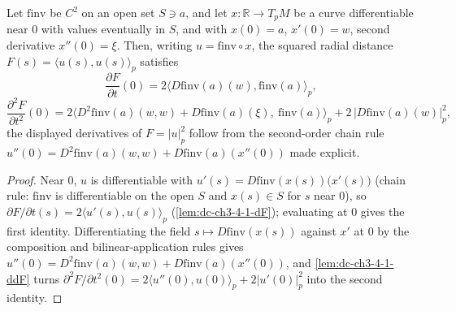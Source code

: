 \begin{lemma}
  \label{lem:dc-ch3-4-1-fidentity}
  \leanok
  Let $\mathrm{finv}$ be $C^2$ on an open set $S\ni a$, and let $x:\mathbb R\to T_pM$ be a
  curve differentiable near $0$ with values eventually in $S$, and with $x(0)=a$, $x'(0)=w$,
  second derivative $x''(0)=\xi$. Then, writing $u=\mathrm{finv}\circ x$, the squared radial
  distance $F(s)=\langle u(s),u(s)\rangle_p$ satisfies
  $$\frac{\partial F}{\partial t}(0)=2\langle D\mathrm{finv}(a)(w),\mathrm{finv}(a)\rangle_p,$$
  $$\frac{\partial^2 F}{\partial t^2}(0)
    =2\big\langle D^2\mathrm{finv}(a)(w,w)+D\mathrm{finv}(a)(\xi),\ \mathrm{finv}(a)\big\rangle_p
      +2\,\big|D\mathrm{finv}(a)(w)\big|_p^2,$$
  the displayed derivatives of $F=|u|_p^2$ follow from the second-order chain rule
  $u''(0)=D^2\mathrm{finv}(a)(w,w)+D\mathrm{finv}(a)(x''(0))$ made explicit.
\end{lemma}
\begin{proof}
  \sketch
  \leanok
  Near $0$, $u$ is differentiable with $u'(s)=D\mathrm{finv}(x(s))\big(x'(s)\big)$ (chain rule:
  $\mathrm{finv}$ is differentiable on the open $S$ and $x(s)\in S$ for $s$ near $0$), so
  $\partial F/\partial t(s)=2\langle u'(s),u(s)\rangle_p$ (\cref{lem:dc-ch3-4-1-dF}); evaluating
  at $0$ gives the first identity. Differentiating the field $s\mapsto D\mathrm{finv}(x(s))$
  against $x'$ at $0$ by the composition and bilinear-application rules gives
  $u''(0)=D^2\mathrm{finv}(a)(w,w)+D\mathrm{finv}(a)(x''(0))$, and \cref{lem:dc-ch3-4-1-ddF}
  turns $\partial^2 F/\partial t^2(0)=2\langle u''(0),u(0)\rangle_p+2|u'(0)|_p^2$ into the
  second identity.
\end{proof}

